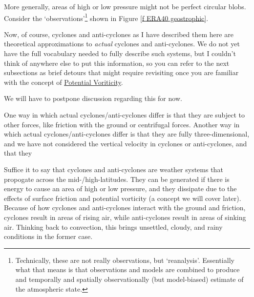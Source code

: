 More generally, areas of high or low pressure might not be perfect circular blobs. Consider the `observations'\footnote{
    Technically, these are not really observations, but `reanalysis'. Essentially what that means is that observations and models are combined to produce and temporally and spatially observationally (but model-biased) estimate of the atmospheric state.
} shown in Figure \ref{f ERA40 geostrophic}.

Now, of course, cyclones and anti-cyclones as I have described them here are theoretical approximations to \textit{actual} cyclones and anti-cyclones. We do not yet have the full vocabulary needed to fully describe such systems, but I couldn't think of anywhere else to put this information, so you can refer to the next subsections as brief detours that might require revisiting once you are familiar with the concept of \hyperref[PV]{Potential Voriticity}.

We will have to postpone discussion regarding this for now.

One way in which actual cyclones/anti-cyclones differ is that they are subject to other forces, like friction with the ground or centrifugal forces. Another way in which actual cyclones/anti-cyclones differ is that they are fully three-dimensional, and we have not considered the vertical velocity in cyclones or anti-cyclones, and that they 

Suffice it to say that cyclones and anti-cyclones are weather systems that propogate across the mid-/high-latitudes. They can be generated if there is energy to cause an area of high or low pressure, and they dissipate due to the effects of surface friction and potential vorticity (a concept we will cover later). Because of how cyclones and anti-cyclones interact with the ground and friction, cyclones result in areas of rising air, while anti-cyclones result in areas of sinking air. Thinking back to convection, this brings unsettled, cloudy, and rainy conditions in the former case.

